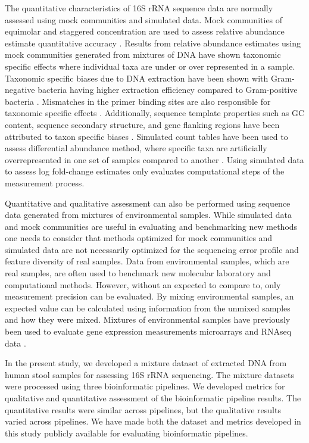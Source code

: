 \documentclass{bmcart}
\begin{document}
The quantitative characteristics of 16S rRNA sequence data are normally
assessed using mock communities and simulated data. Mock communities of
equimolar and staggered concentration are used to assess relative
abundance estimate quantitative accuracy \cite{Kopylova2014}.
Results from relative abundance estimates using mock communities
generated from mixtures of DNA have shown taxonomic specific effects
where individual taxa are under or over represented in a sample.
Taxonomic specific biases due to DNA extraction have been shown with
Gram-negative bacteria having higher extraction efficiency compared to
Gram-positive bacteria \cite{Costea2017,Olson2012}. Mismatches in
the primer binding sites are also responsible for taxonomic specific
effects \cite{brooks2015truth,klindworth2012evaluation,Gohl2016}.
Additionally, sequence template properties such as GC content, sequence
secondary structure, and gene flanking regions have been attributed to
taxon specific biases \cite{Pinto2012,Hansen1998,Gohl2016}.
Simulated count tables have been used to assess differential abundance
method, where specific taxa are artificially overrepresented in one set
of samples compared to another \cite{McMurdie2014}. Using simulated
data to assess log fold-change estimates only evaluates computational
steps of the measurement process.

Quantitative and qualitative assessment can also be performed using
sequence data generated from mixtures of environmental samples. While
simulated data and mock communities are useful in evaluating and
benchmarking new methods one needs to consider that methods optimized
for mock communities and simulated data are not necessarily optimized
for the sequencing error profile and feature diversity of real samples.
Data from environmental samples, which are real samples, are often used
to benchmark new molecular laboratory and computational methods.
However, without an expected to compare to, only measurement precision
can be evaluated. By mixing environmental samples, an expected value can
be calculated using information from the unmixed samples and how they
were mixed. Mixtures of environmental samples have previously been used
to evaluate gene expression measurements microarrays and RNAseq data
\cite{parsons2015using,pine2011adaptable,thompson2005use}.

In the present study, we developed a mixture dataset of extracted DNA
from human stool samples for assessing 16S rRNA sequencing. The mixture
datasets were processed using three bioinformatic pipelines. We
developed metrics for qualitative and quantitative assessment of the
bioinformatic pipeline results. The quantitative results were similar
across pipelines, but the qualitative results varied across pipelines.
We have made both the dataset and metrics developed in this study
publicly available for evaluating bioinformatic pipelines.
\end{document}

